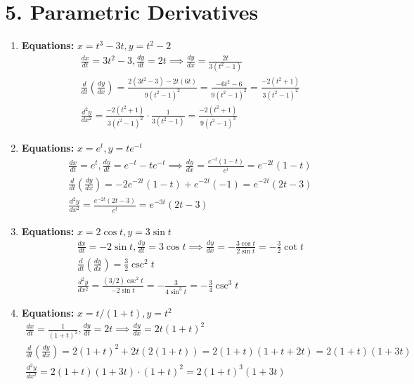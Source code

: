 \documentclass[12pt]{article}
\newcommand{\problemsettitle}[1]{\section*{#1}}
\begin{document}
\newpage
\problemsettitle{5. Parametric Derivatives}
\begin{enumerate}
    \item \textbf{Equations:} $x=t^3-3t, y=t^2-2$
    \begin{align*}
        \frac{dx}{dt} = 3t^2-3, \frac{dy}{dt}=2t \implies \frac{dy}{dx} = \frac{2t}{3(t^2-1)} \\
        \frac{d}{dt}(\frac{dy}{dx}) = \frac{2(3t^2-3)-2t(6t)}{9(t^2-1)^2} = \frac{-6t^2-6}{9(t^2-1)^2} = \frac{-2(t^2+1)}{3(t^2-1)^2} \\
        \frac{d^2y}{dx^2} = \frac{-2(t^2+1)}{3(t^2-1)^2} \cdot \frac{1}{3(t^2-1)} = \frac{-2(t^2+1)}{9(t^2-1)^3}
    \end{align*}

    \item \textbf{Equations:} $x=e^t, y=te^{-t}$
    \begin{align*}
        \frac{dx}{dt}=e^t, \frac{dy}{dt}=e^{-t}-te^{-t} \implies \frac{dy}{dx} = \frac{e^{-t}(1-t)}{e^t} = e^{-2t}(1-t) \\
        \frac{d}{dt}(\frac{dy}{dx}) = -2e^{-2t}(1-t) + e^{-2t}(-1) = e^{-2t}(2t-3) \\
        \frac{d^2y}{dx^2} = \frac{e^{-2t}(2t-3)}{e^t} = e^{-3t}(2t-3)
    \end{align*}

    \item \textbf{Equations:} $x=2\cos t, y=3\sin t$
    \begin{align*}
        \frac{dx}{dt}=-2\sin t, \frac{dy}{dt}=3\cos t \implies \frac{dy}{dx} = -\frac{3\cos t}{2\sin t} = -\frac{3}{2}\cot t \\
        \frac{d}{dt}(\frac{dy}{dx}) = \frac{3}{2}\csc^2 t \\
        \frac{d^2y}{dx^2} = \frac{(3/2)\csc^2 t}{-2\sin t} = -\frac{3}{4\sin^3 t} = -\frac{3}{4}\csc^3 t
    \end{align*}

    \item \textbf{Equations:} $x=t/(1+t), y=t^2$
    \begin{align*}
        \frac{dx}{dt} = \frac{1}{(1+t)^2}, \frac{dy}{dt}=2t \implies \frac{dy}{dx} = 2t(1+t)^2 \\
        \frac{d}{dt}(\frac{dy}{dx}) = 2(1+t)^2 + 2t(2(1+t)) = 2(1+t)(1+t+2t) = 2(1+t)(1+3t) \\
        \frac{d^2y}{dx^2} = 2(1+t)(1+3t) \cdot (1+t)^2 = 2(1+t)^3(1+3t)
    \end{align*}


\end{enumerate}
\end{document}
